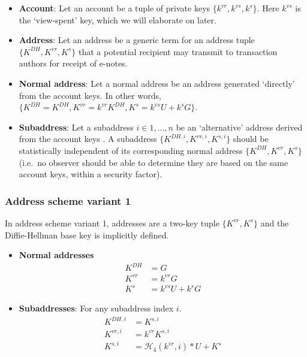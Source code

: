 \begin{itemize}
    \item \textbf{Account}: Let an account be a tuple of private keys $\{k^{vr}, k^{vs}, k^s\}$. Here $k^{vs}$ is the `view-spent' key, which we will elaborate on later.

    \item \textbf{Address}: Let an address be a generic term for an address tuple $\{K^{DH}, K^{vr}, K^s\}$ that a potential recipient may transmit to transaction authors for receipt of e-notes.

    \item \textbf{Normal address}: Let a normal address be an address generated `directly' from the account keys. In other words, $\{K^{DH} = K^{DH}, K^{vr} = k^{vr} K^{DH}, K^s = k^{vs} U + k^s G\}$.

    \item \textbf{Subaddress}: Let a subaddress $i \in 1,...,n$ be an `alternative' address derived from the account keys \cite{MRL-0006-subaddresses, subaddress-pull-request}. A subaddress $\{K^{DH,i}, K^{vr,i}, K^{s,i}\}$ should be statistically independent of its corresponding normal address $\{K^{DH}, K^{vr}, K^s\}$ (i.e.\ no observer should be able to determine they are based on the same account keys, within a security factor).
\end{itemize}

\subsubsection{Address scheme variant 1}

In address scheme variant 1, addresses are a two-key tuple $\{K^{vr}, K^s\}$ and the Diffie-Hellman base key is implicitly defined.

\begin{itemize}
    \item \textbf{Normal addresses}
    \begin{align*}
        K^{DH} &= G  \\
        K^{vr} &= k^{vr} G  \\
        K^{s} &= k^{vs} U + k^s G
    \end{align*}

    \item \textbf{Subaddresses}: For any subaddress index $i$.\vspace{.115cm}
    \begin{align*}
        K^{DH,i} &= K^{s,i}  \\
        K^{vr,i} &= k^{vr} K^{s,i}  \\
        K^{s,i} &= \mathcal{H}_4(k^{vr},i)*U + K^s
    \end{align*}
\end{itemize}

